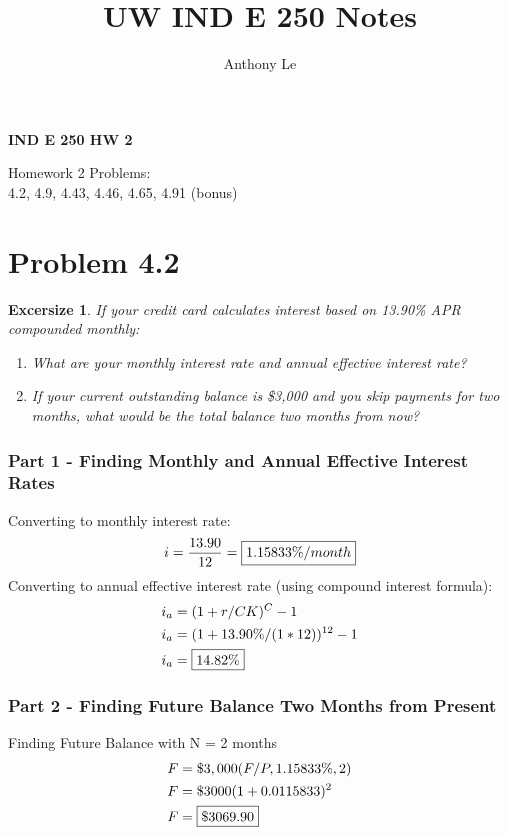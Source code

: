 \documentclass[../INDE250HW.tex]{subfiles}
\title{UW IND E 250 Notes}
\author{Anthony Le}
\newtheorem{exrc}{Excersize}
\begin{document}
\pagestyle{fancy}
\fancyhead{}

\begin{center}
    \LARGE{\textbf{IND E 250 HW 2}}
\end{center}
\begin{center}
    Homework 2 Problems: \\
    4.2, 4.9, 4.43, 4.46, 4.65, 4.91 (bonus)
\end{center}
\section*{Problem 4.2}
\begin{exrc}
    If your credit card calculates interest based on 13.90\% APR compounded monthly:
    \begin{enumerate}
        \item What are your monthly interest rate and annual effective interest rate?
        \item If your current outstanding balance is \$3,000 and you skip payments for two months, what would be the total balance two months from now?
    \end{enumerate}
\end{exrc}
\subsubsection*{Part 1 - Finding Monthly and Annual Effective Interest Rates}
Converting to monthly interest rate:
\begin{equation*}
    \begin{aligned}
        i = \frac{13.90}{12} = \framebox{$1.15833\%/month$}
    \end{aligned}
\end{equation*}
Converting to annual effective interest rate (using compound interest formula):
\begin{equation*}
    \begin{aligned}
        i_a &= (1 + r/CK)^C - 1 \\
        i_a &= (1 + 13.90\%/(1*12))^{12} - 1 \\
        i_a &= \framebox{$14.82\%$}
    \end{aligned}
\end{equation*}
\subsubsection*{Part 2 - Finding Future Balance Two Months from Present}
Finding Future Balance with N = 2 months
\begin{equation*}
    \begin{aligned}
        F &= \$3,000(F/P,1.15833\%,2) \\
        F &= \$3000(1 + 0.0115833)^2 \\
        F &= \framebox{$\$3069.90$} 
    \end{aligned}
\end{equation*}
\end{document}
